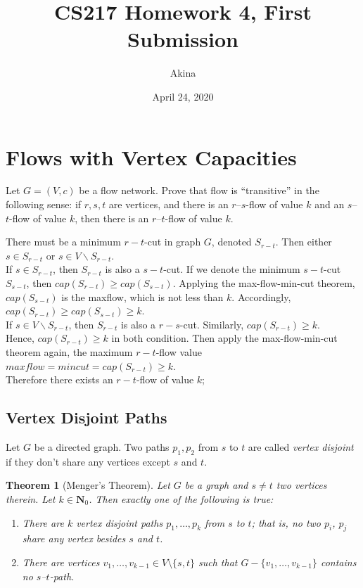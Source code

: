 \documentclass[11pt,a4paper,oneside]{article}
\newtheorem{theorem}{Theorem}
\renewcommand{\hwtitle} {CS217 Homework 4, First Submission}
\renewcommand{\hwauthor}{Akina}
\renewcommand{\hwdate}{April 24, 2020}
\begin{document}
\title{\hwtitle}
\author{\hwauthor}
\date{\hwdate}
\maketitle



\setcounter{section}{4}
\section{Flows with Vertex Capacities}


\begin{problem}{1}
	\statement
    Let $G = (V,c)$ be a flow network. Prove that flow is ``transitive'' in the following sense: if $r,s,t$ are vertices, 
    and there is an $r$--$s$-flow of value $k$ and an $s$--$t$-flow of value $k$, then there is an $r$--$t$-flow of 
    value $k$.
    
    \solution
    There must be a minimum $r-t$-cut in graph $G$, denoted $S_{r-t}$. Then  either $s \in S_{r-t}$ or $s \in V \backslash S_{r-t} $.\\
    If $s \in S_{r-t}$, then $S_{r-t}$ is also a $s - t$-cut. If we denote the minimum $s-t$-cut $S_{s-t}$, then $cap(S_{r-t}) \ge cap(S_{s-t})$. Applying the max-flow-min-cut theorem, $cap(S_{s-t})$ is the maxflow, which is not less than $k$. Accordingly, $cap(S_{r-t}) \ge cap(S_{s-t}) \ge k$.\\
    If $s \in V \backslash S_{r-t}$, then $S_{r-t}$ is also a $r - s$-cut. Similarly, $cap(S_{r-t}) \ge k$.\\
    Hence, $cap(S_{r-t}) \ge k$ in both condition. Then apply the max-flow-min-cut theorem again, the maximum $r - t$-flow value $maxflow = mincut = cap(S_{r - t}) \ge k$.\\
    Therefore there exists an $r-t$-flow of value $k$;
\end{problem}

\subsection{Vertex Disjoint Paths}

Let $G$ be a directed graph. Two paths $p_1, p_2$ from $s$ to $t$ are called {\em vertex disjoint}
if they don't share any vertices except $s$ and $t$. 

\begin{theorem}[Menger's Theorem]
   Let $G$ be a graph and $s \ne t$ two vertices therein. Let $k \in \mathbf{N}_0$. 
   Then exactly one of the following is true:
   \begin{enumerate}
   \item There are $k$ vertex disjoint paths $p_1,\dots,p_k$ from $s$ to $t$; that is, no two $p_i$, $p_j$ share
   any vertex besides $s$ and $t$.
   \item There are vertices $v_1,\dots,v_{k-1} \in V \setminus \{s,t\}$ such that
   $G - \{v_1,\dots, v_{k-1}\}$ contains no $s$--$t$-path.
   \end{enumerate}
\end{theorem}
\end{document}
